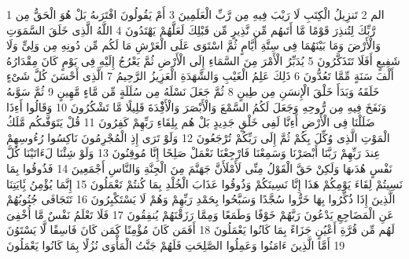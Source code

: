 \documentclass[20pt,a4paper]{article}
\title{}
\author{}
\date{}
\begin{document}
\pagecolor{cl_page}



{\tiny\colorbox{cl_aya}{1}} الم
{\tiny\colorbox{cl_aya}{2}} تَنزِيلُ الْكِتَبِ لَا رَيْبَ فِيهِ مِن رَّبِّ الْعَلَمِينَ
{\tiny\colorbox{cl_aya}{3}} أَمْ يَقُولُونَ افْتَرَىهُ بَلْ هُوَ الْحَقُّ مِن رَّبِّكَ لِتُنذِرَ قَوْمًا مَّا أَتَىهُم مِّن نَّذِيرٍ مِّن قَبْلِكَ لَعَلَّهُمْ يَهْتَدُونَ
{\tiny\colorbox{cl_aya}{4}} اللَّهُ الَّذِى خَلَقَ السَّمَوَتِ وَالْأَرْضَ وَمَا بَيْنَهُمَا فِى سِتَّةِ أَيَّامٍ ثُمَّ اسْتَوَى عَلَى الْعَرْشِ مَا لَكُم مِّن دُونِهِ مِن وَلِىٍّ وَلَا شَفِيعٍ أَفَلَا تَتَذَكَّرُونَ
{\tiny\colorbox{cl_aya}{5}} يُدَبِّرُ الْأَمْرَ مِنَ السَّمَاءِ إِلَى الْأَرْضِ ثُمَّ يَعْرُجُ إِلَيْهِ فِى يَوْمٍ كَانَ مِقْدَارُهُ أَلْفَ سَنَةٍ مِّمَّا تَعُدُّونَ
{\tiny\colorbox{cl_aya}{6}} ذَلِكَ عَلِمُ الْغَيْبِ وَالشَّهَدَةِ الْعَزِيزُ الرَّحِيمُ
{\tiny\colorbox{cl_aya}{7}} الَّذِى أَحْسَنَ كُلَّ شَىْءٍ خَلَقَهُ وَبَدَأَ خَلْقَ الْإِنسَنِ مِن طِينٍ
{\tiny\colorbox{cl_aya}{8}} ثُمَّ جَعَلَ نَسْلَهُ مِن سُلَلَةٍ مِّن مَّاءٍ مَّهِينٍ
{\tiny\colorbox{cl_aya}{9}} ثُمَّ سَوَّىهُ وَنَفَخَ فِيهِ مِن رُّوحِهِ وَجَعَلَ لَكُمُ السَّمْعَ وَالْأَبْصَرَ وَالْأَفِْٔدَةَ قَلِيلًا مَّا تَشْكُرُونَ
{\tiny\colorbox{cl_aya}{10}} وَقَالُوا أَءِذَا ضَلَلْنَا فِى الْأَرْضِ أَءِنَّا لَفِى خَلْقٍ جَدِيدٍ بَلْ هُم بِلِقَاءِ رَبِّهِمْ كَفِرُونَ
{\tiny\colorbox{cl_aya}{11}} قُلْ يَتَوَفَّىكُم مَّلَكُ الْمَوْتِ الَّذِى وُكِّلَ بِكُمْ ثُمَّ إِلَى رَبِّكُمْ تُرْجَعُونَ
{\tiny\colorbox{cl_aya}{12}} وَلَوْ تَرَى إِذِ الْمُجْرِمُونَ نَاكِسُوا رُءُوسِهِمْ عِندَ رَبِّهِمْ رَبَّنَا أَبْصَرْنَا وَسَمِعْنَا فَارْجِعْنَا نَعْمَلْ صَلِحًا إِنَّا مُوقِنُونَ
{\tiny\colorbox{cl_aya}{13}} وَلَوْ شِئْنَا لَءَاتَيْنَا كُلَّ نَفْسٍ هُدَىهَا وَلَكِنْ حَقَّ الْقَوْلُ مِنِّى لَأَمْلَأَنَّ جَهَنَّمَ مِنَ الْجِنَّةِ وَالنَّاسِ أَجْمَعِينَ
{\tiny\colorbox{cl_aya}{14}} فَذُوقُوا بِمَا نَسِيتُمْ لِقَاءَ يَوْمِكُمْ هَذَا إِنَّا نَسِينَكُمْ وَذُوقُوا عَذَابَ الْخُلْدِ بِمَا كُنتُمْ تَعْمَلُونَ
{\tiny\colorbox{cl_aya}{15}} إِنَّمَا يُؤْمِنُ بَِٔايَتِنَا الَّذِينَ إِذَا ذُكِّرُوا بِهَا خَرُّوا سُجَّدًا وَسَبَّحُوا بِحَمْدِ رَبِّهِمْ وَهُمْ لَا يَسْتَكْبِرُونَ
{\tiny\colorbox{cl_aya}{16}} تَتَجَافَى جُنُوبُهُمْ عَنِ الْمَضَاجِعِ يَدْعُونَ رَبَّهُمْ خَوْفًا وَطَمَعًا وَمِمَّا رَزَقْنَهُمْ يُنفِقُونَ
{\tiny\colorbox{cl_aya}{17}} فَلَا تَعْلَمُ نَفْسٌ مَّا أُخْفِىَ لَهُم مِّن قُرَّةِ أَعْيُنٍ جَزَاءً بِمَا كَانُوا يَعْمَلُونَ
{\tiny\colorbox{cl_aya}{18}} أَفَمَن كَانَ مُؤْمِنًا كَمَن كَانَ فَاسِقًا لَّا يَسْتَوُنَ
{\tiny\colorbox{cl_aya}{19}} أَمَّا الَّذِينَ ءَامَنُوا وَعَمِلُوا الصَّلِحَتِ فَلَهُمْ جَنَّتُ الْمَأْوَى نُزُلًا بِمَا كَانُوا يَعْمَلُونَ
\end{document}
